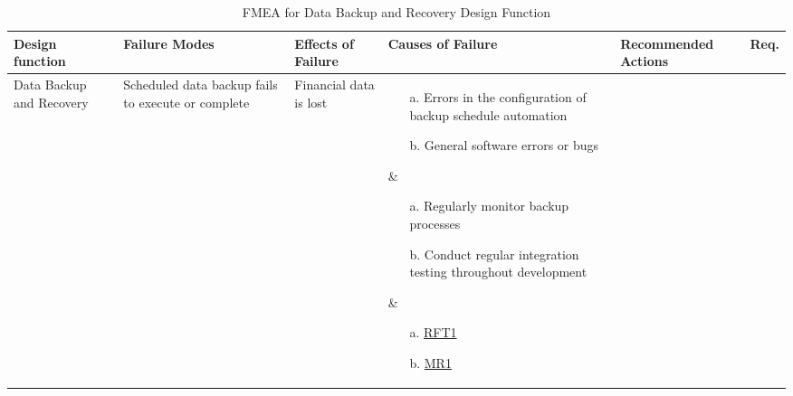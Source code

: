 \documentclass{article}
\begin{document}
\begin{landscape}
\begin{table}
\begin{tabular}{|p{2.5cm}|p{3cm}|p{3cm}|p{5cm}|p{5cm}|p{2cm}|}
\end{tabular}
\end{table}



\begin{table}
\centering
\caption{FMEA for Data Backup and Recovery Design Function}
\begin{tabular}{|p{2.5cm}|p{3cm}|p{3cm}|p{5cm}|p{5cm}|p{2cm}|}
\hline
\rowcolor{lightgray}
\textbf{Design function} & \textbf{Failure Modes} & \textbf{Effects of Failure} & \textbf{Causes of Failure} & \textbf{Recommended Actions} & \textbf{Req.} \\ \hline

\parbox[t]{2.5cm}{\raggedright Data Backup and Recovery} & \parbox[t]{3cm}{\raggedright Scheduled data backup fails to execute or complete} & \parbox[t]{3cm}{\raggedright Financial data is lost} &
\parbox[t]{5cm}{\raggedright
    \begin{enumerate}
      \item[a.] Errors in the configuration of backup schedule automation
      \item[b.] General software errors or bugs
    \end{enumerate}
  } &
\parbox[t]{5cm}{\raggedright
    \begin{enumerate}
        \item[a.] Regularly monitor backup processes
        \item[b.] Conduct regular integration testing throughout development
    \end{enumerate}
} &

\parbox[t]{2cm}{\raggedright
    \begin{enumerate}
        \item[a.] \href{https://github.com/ausbennett/mes-finance-platform/blob/main/docs/SRS/SRS.tex\#L597}{RFT1}
        \item[b.] \href{https://github.com/ausbennett/mes-finance-platform/blob/main/docs/SRS/SRS.tex\#L687}{MR1}
    \end{enumerate}
}
\\ \hline


\end{tabular}
\end{table}
\end{landscape}
\end{document}
